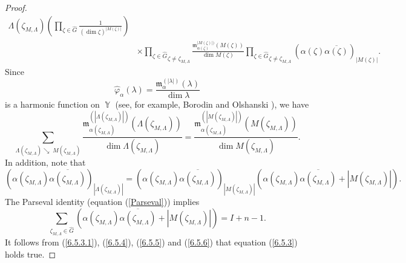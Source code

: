 \documentclass[12pt]{amsart}
\theoremstyle{definition}
\numberwithin{equation}{section}
\DeclareMathOperator{\Y}{\mathbb{Y}}
\begin{document}
\begin{proof}
\begin{equation}
\begin{split}
{\Lambda(\zeta_{M,\Lambda})}
\left(\prod\limits_{\zeta\in\widehat{G}}\frac{1}{(\dim\zeta)^{|M(\zeta)|}}\right)\\
&\times\underset{\zeta\neq\zeta_{M,\Lambda}}{\prod\limits_{\zeta\in\widehat{G}}}
\frac{\mathfrak{m}_{\alpha(\zeta)}^{|M(\zeta)|)}(M(\zeta))}{\dim
M(\zeta)}
\underset{\zeta\neq\zeta_{M,\Lambda}}{\prod\limits_{\zeta\in\widehat{G}}}(\alpha(\zeta)\overline{\alpha(\zeta)})_{|M(\zeta)|}.
\end{split}
\end{equation}
Since
$$
\hat{\varphi}_{\alpha}(\lambda)=\frac{\mathfrak{m}_{\alpha}^{(|\lambda|)}(\lambda)}{\dim\lambda}
$$
is a harmonic function on $\Y$ (see, for example, Borodin and Olshanski \cite{BorodinOlshanskiMarkov}), we have
\begin{equation}\label{6.5.5}
\sum\limits_{\Lambda(\zeta_{M,\Lambda})\searrow\; M(\zeta_{M,\Lambda})}\frac{\mathfrak{m}_{\alpha(\zeta_{M,\Lambda})}^{(|\Lambda(\zeta_{M,\Lambda})|)}(\Lambda(\zeta_{M,\Lambda}))}{\dim
\Lambda(\zeta_{M,\Lambda})}
=\frac{\mathfrak{m}_{\alpha(\zeta_{M,\Lambda})}^{(|M(\zeta_{M,\Lambda})|)}(M(\zeta_{M,\Lambda}))}{\dim
M(\zeta_{M,\Lambda})}.
\end{equation}
In addition, note that
$$
\left(\alpha(\zeta_{M,\Lambda})\overline{\alpha(\zeta_{M,\Lambda})}\right)_{|\Lambda(\zeta_{M,\Lambda})|}
=\left(\alpha(\zeta_{M,\Lambda})\overline{\alpha(\zeta_{M,\Lambda})}\right)_{|M(\zeta_{M,\Lambda})|}
\left(\alpha(\zeta_{M,\Lambda})\overline{\alpha(\zeta_{M,\Lambda})}+|M(\zeta_{M,\Lambda})|\right).
$$
The Parseval identity (equation (\ref{Parseval})) implies
\begin{equation}\label{6.5.6}
\sum\limits_{\zeta_{M,\Lambda}\in\widehat{G}}\left(\alpha(\zeta_{M,\Lambda})\overline{\alpha(\zeta_{M,\Lambda})}+|M(\zeta_{M,\Lambda})|\right)
=I+n-1.
\end{equation}
It follows from (\ref{6.5.3.1}), (\ref{6.5.4}), (\ref{6.5.5}) and (\ref{6.5.6}) that equation (\ref{6.5.3}) holds true.
\end{proof}
\end{document}
